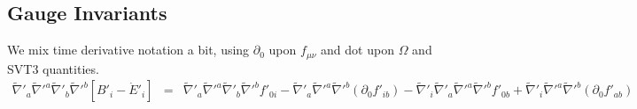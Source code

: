 \documentclass[10pt,letterpaper]{article}
\numberwithin{equation}{section}
\begin{document}
\subsection{Gauge Invariants}
We mix time derivative notation a bit, using $\partial_0$ upon $f_{\mu\nu}$ and dot upon $\Omega$ and SVT3 quantities. 
\begin{eqnarray}
%
\tilde\nabla'_a\tilde\nabla'^a\tilde\nabla'_b\tilde\nabla'^b[B'_i -\dot E'_i] &=& \tilde\nabla'_a\tilde\nabla'^a\tilde\nabla'_b\tilde\nabla'^b f'_{0i}
-\tilde\nabla'_a\tilde\nabla'^a\tilde\nabla'^b (\partial_0 f'_{ib})
-\tilde\nabla'_i \tilde\nabla'_a\tilde\nabla'^a\tilde\nabla'^b f'_{0b}
+\tilde\nabla'_i \tilde\nabla'^a \tilde\nabla'^b (\partial_0 f'_{ab})
\end{eqnarray}
\end{document}
